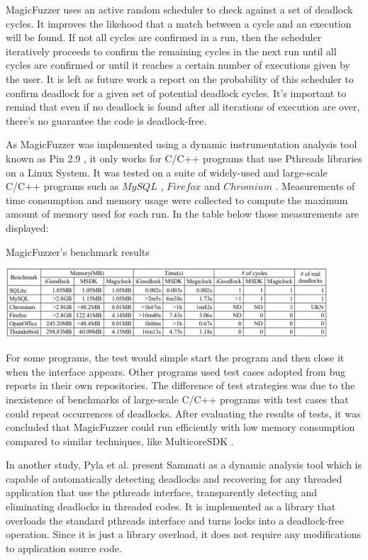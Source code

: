 MagicFuzzer uses an active random scheduler to check against a set of deadlock cycles. It improves the likehood that a match between a cycle and an execution will be found.
If not all cycles are confirmed in a run, then the scheduler iteratively proceeds to confirm the remaining cycles in the next run until all cycles are confirmed or until it
reaches a certain number of executions given by the user. It is left as future work a report on the probability of this scheduler to confirm deadlock for a given set of potential deadlock cycles. It's important to remind that even if no deadlock is found after all iterations of execution are over, there's no guarantee the code is deadlock-free. 

As MagicFuzzer was implemented using a dynamic instrumentation analysis tool known as Pin 2.9 \cite{pin}, it only works for C/C++ programs that use Pthreads libraries on a Linux System.
It was tested on a suite of widely-used and large-scale C/C++ programs such as $MySQL$ \cite{mysql}, $Firefox$ \cite{firefox} and $Chromium$ \cite{chromium}.
Measurements of time consumption and memory usage were collected to compute the maximum amount of memory used for each run. In the table below those measurements are displayed:

\begin{table}
\caption{MagicFuzzer's benchmark results}
\vspace{0 cm}
\centering
\includegraphics[width=12cm]{img/magicfuzzerbenchmark.png}
\end{table}

For some programs, the test would simple start the program and then close it when the interface appears.
Other programs used test cases adopted from bug reports in their own repositories.
The difference of test strategies was due to the inexistence of benchmarks of large-scale C/C++ programs with test cases that could repeat occurrences of deadlocks.
After evaluating the results of tests, it was concluded that MagicFuzzer could run efficiently with low memory consumption compared to similar techniques, like MulticoreSDK \cite{mcsdk}.

In another study, Pyla et al. \cite{sammati}
present Sammati as a dynamic analysis tool which is capable of automatically detecting deadlocks and recovering for any threaded application that use the pthreads interface,
transparently detecting and eliminating deadlocks in threaded codes.
It is implemented as a library that overloads the standard pthreads interface and turns locks into a deadlock-free operation. Since it is just a library overload,
it does not require any modifications to application source code.

